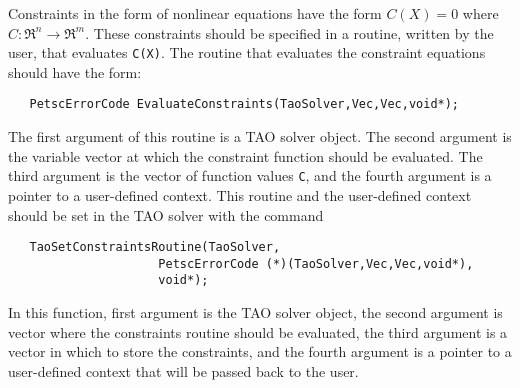 Constraints in the form of nonlinear equations have the form
$C(X) = 0$ where $C: \Re^n \to \Re^m$.
These constraints should be specified in a 
routine, written by the user, that evaluates {\tt C(X)}.
The routine that evaluates the constraint equations should have the form:
\begin{verbatim}
   PetscErrorCode EvaluateConstraints(TaoSolver,Vec,Vec,void*);
\end{verbatim}
\noindent
The first argument of this routine is a TAO solver object.  The second argument
is the variable vector at which the constraint function should be evaluated.  
The third argument is the vector of function values {\tt C}, and the fourth
argument is a pointer to a user-defined context.
This routine  and the user-defined context 
should be set in the TAO solver with the command
\begin{verbatim}
   TaoSetConstraintsRoutine(TaoSolver,
                     PetscErrorCode (*)(TaoSolver,Vec,Vec,void*),
                     void*);
\end{verbatim}
\noindent
In this function, first argument is the TAO solver object,
the second argument is vector where the constraints routine should be
evaluated, the third argument is a vector in which to store the constraints,
and the fourth argument is a pointer to a user-defined context that will
be passed back to the user.


